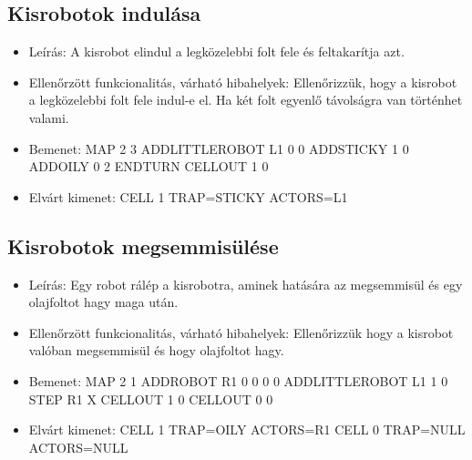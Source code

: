 \subsection{Kisrobotok indulása}
\begin{itemize}
	\item Leírás: \newline
	A kisrobot elindul a legközelebbi folt fele és feltakarítja azt.
	\item Ellenőrzött funkcionalitás, várható hibahelyek: \newline
	Ellenőrizzük, hogy a kisrobot a legközelebbi folt fele indul-e el. Ha két folt egyenlő távolságra van történhet valami.
	\item Bemenet: \newline
	MAP 2 3 \newline
	ADDLITTLEROBOT L1 0 0 \newline
	ADDSTICKY 1 0 \newline
	ADDOILY 0 2 \newline
	ENDTURN \newline
	CELLOUT 1 0 \newline
	\item Elvárt kimenet: \newline
	CELL 1 TRAP=STICKY ACTORS=L1 \newline
\end{itemize}

\subsection{Kisrobotok megsemmisülése}
\begin{itemize}
	\item Leírás: \newline
	Egy robot rálép a kisrobotra, aminek hatására az megsemmisül és egy olajfoltot hagy maga után.
	\item Ellenőrzött funkcionalitás, várható hibahelyek: \newline
	Ellenőrizzük hogy a kisrobot valóban megsemmisül és hogy olajfoltot hagy.
	\item Bemenet: \newline
	MAP 2 1 \newline
	ADDROBOT R1 0 0 0 0 \newline
	ADDLITTLEROBOT L1 1 0 \newline
	STEP R1 X \newline
	CELLOUT 1 0 \newline
	CELLOUT 0 0 \newline
	\item Elvárt kimenet: \newline
	CELL 1 TRAP=OILY ACTORS=R1 \newline
	CELL 0 TRAP=NULL ACTORS=NULL \newline
	
	
\end{itemize}

